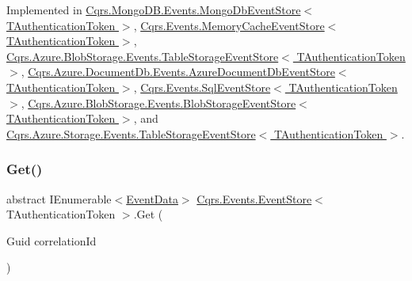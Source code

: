 Implemented in \hyperlink{classCqrs_1_1MongoDB_1_1Events_1_1MongoDbEventStore_a7a1ac8e59dc5bff0bb6562fb4f43e8df_a7a1ac8e59dc5bff0bb6562fb4f43e8df}{Cqrs.\+Mongo\+D\+B.\+Events.\+Mongo\+Db\+Event\+Store$<$ T\+Authentication\+Token $>$}, \hyperlink{classCqrs_1_1Events_1_1MemoryCacheEventStore_a1391c260f52f5cf18058cf88ad2d16de_a1391c260f52f5cf18058cf88ad2d16de}{Cqrs.\+Events.\+Memory\+Cache\+Event\+Store$<$ T\+Authentication\+Token $>$}, \hyperlink{classCqrs_1_1Azure_1_1BlobStorage_1_1Events_1_1TableStorageEventStore_a420c94c86d8d1c2959aee8602f43c0c0_a420c94c86d8d1c2959aee8602f43c0c0}{Cqrs.\+Azure.\+Blob\+Storage.\+Events.\+Table\+Storage\+Event\+Store$<$ T\+Authentication\+Token $>$}, \hyperlink{classCqrs_1_1Azure_1_1DocumentDb_1_1Events_1_1AzureDocumentDbEventStore_a54f298fdde141166e23f01e4911bf188_a54f298fdde141166e23f01e4911bf188}{Cqrs.\+Azure.\+Document\+Db.\+Events.\+Azure\+Document\+Db\+Event\+Store$<$ T\+Authentication\+Token $>$}, \hyperlink{classCqrs_1_1Events_1_1SqlEventStore_a7e32a08a015642a5bc1cefa6998e6f11_a7e32a08a015642a5bc1cefa6998e6f11}{Cqrs.\+Events.\+Sql\+Event\+Store$<$ T\+Authentication\+Token $>$}, \hyperlink{classCqrs_1_1Azure_1_1BlobStorage_1_1Events_1_1BlobStorageEventStore_ab68b594c54ae5a79e3b8d5db1902752d_ab68b594c54ae5a79e3b8d5db1902752d}{Cqrs.\+Azure.\+Blob\+Storage.\+Events.\+Blob\+Storage\+Event\+Store$<$ T\+Authentication\+Token $>$}, and \hyperlink{classCqrs_1_1Azure_1_1Storage_1_1Events_1_1TableStorageEventStore_a089514182da7a70f35f9237c521c49f0_a089514182da7a70f35f9237c521c49f0}{Cqrs.\+Azure.\+Storage.\+Events.\+Table\+Storage\+Event\+Store$<$ T\+Authentication\+Token $>$}.

\mbox{\label{classCqrs_1_1Events_1_1EventStore_a0096646f5dff730b0041b9469719c420_a0096646f5dff730b0041b9469719c420}} 
\subsubsection{\texorpdfstring{Get()}{Get()}\hspace{0.1cm}{\footnotesize\ttfamily [2/2]}}
{\footnotesize\ttfamily abstract I\+Enumerable$<$\hyperlink{classCqrs_1_1Events_1_1EventData}{Event\+Data}$>$ \hyperlink{classCqrs_1_1Events_1_1EventStore}{Cqrs.\+Events.\+Event\+Store}$<$ T\+Authentication\+Token $>$.Get (\begin{DoxyParamCaption}\item[{Guid}]{correlation\+Id }\end{DoxyParamCaption})\hspace{0.3cm}{\ttfamily [pure virtual]}}



